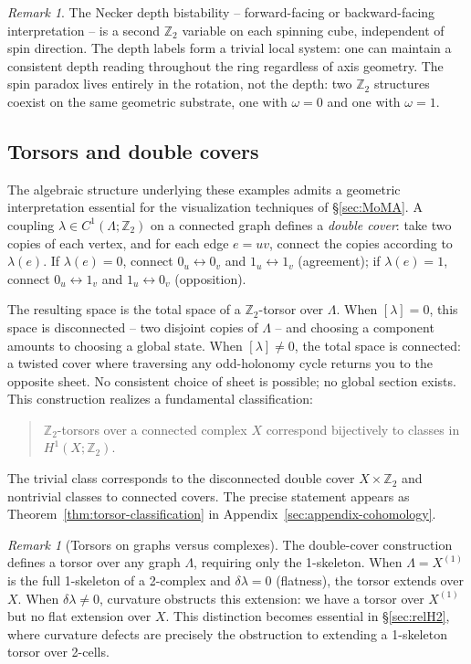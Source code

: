 \documentclass[11pt]{amsart}  %
\theoremstyle{plain}
\theoremstyle{definition}
\theoremstyle{remark}
\newtheorem{remark}[theorem]{Remark}
\newcommand{\style}[1]{{\em #1}} %
\newcommand{\coboundary}{\delta} %
\newcommand{\Z}{\mathbb{Z}} %
\newcommand{\cgraph}{\Lambda} %
\newcommand{\coupling}{\lambda} %
\begin{document}
\begin{remark}
The Necker depth bistability -- forward-facing or backward-facing 
interpretation -- is a second $\Z_2$ variable on each spinning cube, 
independent of spin direction. The depth labels form a trivial local 
system: one can maintain a consistent depth reading throughout the 
ring regardless of axis geometry. The spin paradox lives entirely in 
the rotation, not the depth: two $\Z_2$ structures coexist on the 
same geometric substrate, one with $\omega = 0$ and one with 
$\omega = 1$.
\end{remark}

\subsection{Torsors and double covers}
\label{sec:torsors}

The algebraic structure underlying these examples admits a geometric interpretation essential for the visualization techniques of \S\ref{sec:MoMA}. A coupling $\coupling \in C^1(\cgraph; \Z_2)$ on a connected graph defines a \style{double cover}: take two copies of each vertex, and for each edge $e = uv$, connect the copies according to $\coupling(e)$. If $\coupling(e) = 0$, connect $0_u \leftrightarrow 0_v$ and $1_u \leftrightarrow 1_v$ (agreement); if $\coupling(e) = 1$, connect $0_u \leftrightarrow 1_v$ and $1_u \leftrightarrow 0_v$ (opposition).

The resulting space is the total space of a $\Z_2$-torsor over $\cgraph$. When $[\coupling] = 0$, this space is disconnected -- two disjoint copies of $\cgraph$ -- and choosing a component amounts to choosing a global state. When $[\coupling] \neq 0$, the total space is connected: a twisted cover where traversing any odd-holonomy cycle returns you to the opposite sheet. No consistent choice of sheet is possible; no global section exists.
%
This construction realizes a fundamental classification: 
\begin{quote}
    $\Z_2$-torsors over a connected complex $X$ correspond bijectively to classes in $H^1(X; \Z_2)$.
\end{quote}
The trivial class corresponds to the disconnected double cover $X \times \Z_2$ 
and nontrivial classes to connected covers. The precise statement appears as 
Theorem~\ref{thm:torsor-classification} in Appendix~\ref{sec:appendix-cohomology}.

\begin{remark}[Torsors on graphs versus complexes]
\label{rem:torsor-convention}
The double-cover construction defines a torsor over any graph $\cgraph$, requiring only the 1-skeleton. When $\cgraph = X^{(1)}$ is the full 1-skeleton of a 2-complex and $\coboundary\coupling = 0$ (flatness), the torsor extends over $X$. When $\coboundary\coupling \neq 0$, curvature obstructs this extension: we have a torsor over $X^{(1)}$ but no flat extension over $X$. This distinction becomes essential in \S\ref{sec:relH2}, where curvature defects are precisely the obstruction to extending a 1-skeleton torsor over 2-cells.
\end{remark}
\end{document}
